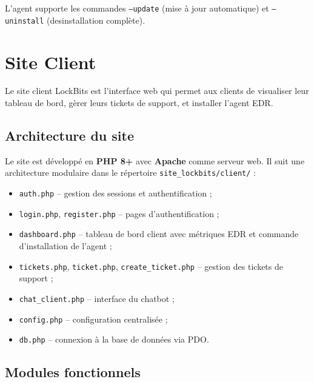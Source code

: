 L'agent supporte les commandes \texttt{--update} (mise à jour automatique)
et \texttt{--uninstall} (desinstallation complète).


\section{Site Client}

Le site client LockBits est l'interface web qui permet aux clients de
visualiser leur tableau de bord, gèrer leurs tickets de support, et
installer l'agent EDR.

\subsection{Architecture du site}

Le site est développé en \textbf{PHP 8+} avec \textbf{Apache} comme
serveur web. Il suit une architecture modulaire dans le répertoire
\texttt{site\_lockbits/client/} :

\begin{itemize}
  \item \texttt{auth.php} -- gestion des sessions et authentification ;
  \item \texttt{login.php}, \texttt{register.php} -- pages
    d'authentification ;
  \item \texttt{dashboard.php} -- tableau de bord client avec métriques
    EDR et commande d'installation de l'agent ;
  \item \texttt{tickets.php}, \texttt{ticket.php},
    \texttt{create\_ticket.php} -- gestion des tickets de support ;
  \item \texttt{chat\_client.php} -- interface du chatbot ;
  \item \texttt{config.php} -- configuration centralisée ;
  \item \texttt{db.php} -- connexion à la base de données via PDO.
\end{itemize}

\subsection{Modules fonctionnels}

